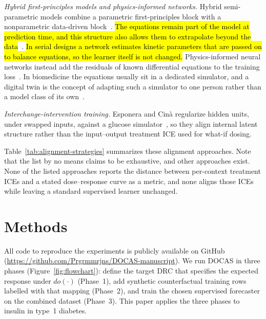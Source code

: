 \documentclass[a4paper,fleqn]{cas-sc}
\begin{document}
\noindent\textit{Hybrid first-principles models and physics-informed networks.}
Hybrid semi-parametric models combine a parametric first-principles block with
a nonparametric data-driven block~\citep{vonstosch2014}. \hl{The equations remain
part of the model at prediction time, and this structure also allows
them to extrapolate beyond the data}~\citep{fiedler2008,samadi2022}. \hl{In serial
designs a network estimates kinetic parameters that are passed on to balance
equations, so the learner itself is not changed.} Physics-informed neural
networks instead add the residuals of known differential equations to the
training loss~\citep{raissi2019}. In biomedicine the equations usually sit in a
dedicated simulator, and a digital twin is the concept of adapting such a
simulator to one person rather than a model class of its
own~\citep{cobelli2009,cappon2023}.

\noindent\textit{Interchange-intervention training.}
Esponera and Cin{\`a} regularize hidden units, under swapped inputs, against a
glucose simulator~\citep{esponera2025}, so they align internal latent structure
rather than the input--output treatment ICE used for what-if dosing.

Table~\ref{tab:alignment-strategies} summarizes these alignment approaches.
Note that the list by no means claims to be exhaustive, and other approaches exist. None of the listed approaches reports the
distance between per-context treatment ICEs and a stated dose--response curve as a
metric, and none aligns those ICEs while leaving a standard supervised learner
unchanged.



\FloatBarrier
\section{Methods}\label{sec:methods}

All code to reproduce the experiments is publicly available on GitHub
(\url{https://github.com/Prgrmmrjns/DOCAS-manuscript}). We run DOCAS in three
phases (Figure~\ref{fig:flowchart}): define the target DRC that specifies the
expected response under $do(\cdot)$ (Phase~1), add synthetic counterfactual
training rows labelled with that mapping (Phase~2), and train the chosen
supervised forecaster on the combined dataset (Phase~3). This paper applies the
three phases to insulin in type~1 diabetes.
\end{document}
